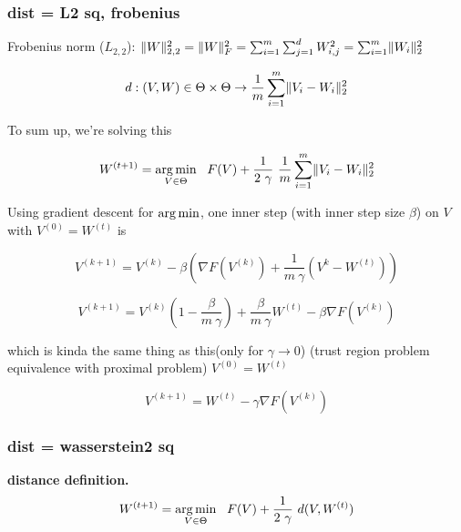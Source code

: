 \subsubsection{dist = L2 sq, frobenius}

Frobenius norm ($L_{2,2}$): $\lVert W\rVert_{2,2}^2 = \lVert W\rVert_F^2 = \sum_{i=1}^{m} \sum_{j=1}^{d} W_{i, j}^2 = \sum_{i=1}^{m} \lVert W_i\rVert_2^2$

\begin{equation}
	d : (V, W) \in \Theta \times \Theta \rightarrow \frac{1}{m} \sum_{i=1}^{m} \lVert V_i - W_i\rVert^2_2
\end{equation}

To sum up, we're solving this 

\begin{equation}
	W^{(t+1)} = \argmin_{V \in \Theta} \ \  F(V) + \frac{1}{2 ~ \gamma} ~ \frac{1}{m} \sum_{i=1}^{m} \norm{V_i - W_i}^2_2
\end{equation}

Using gradient descent for $\operatorname*{arg\,min}$, one inner step (with inner step size $\beta$) on $V$ with $V^{(0)} = W^{(t)}$ is

\begin{equation}
	V^{(k+1)} = V^{(k)} - \beta \left(\nabla F(V^{(k)}) + \frac{1}{m ~ \gamma} (V^{k} - W^{(t)}) \right) 
\end{equation}

\begin{equation}
	V^{(k+1)} = V^{(k)}\left(1 - \frac{\beta}{m ~ \gamma}\right) + \frac{\beta}{m ~ \gamma} W^{(t)}   - \beta \nabla F(V^{(k)})
\end{equation}

which is kinda the same thing as this(only for $\gamma \rightarrow 0$) (trust region problem equivalence with proximal problem) $V^{(0)} = W^{(t)}$

\begin{equation}
	V^{(k+1)} = W^{(t)} - \gamma \nabla F(V^{(k)})
\end{equation}

\subsubsection{dist = wasserstein2 sq}

\textbf{distance definition.}
\begin{equation}
	W^{(t+1)} = \operatorname*{arg\,min}_{V \in \Theta} \ \  F(V) + \frac{1}{2 ~ \gamma} ~ d(V, W^{(t)})
\end{equation}


